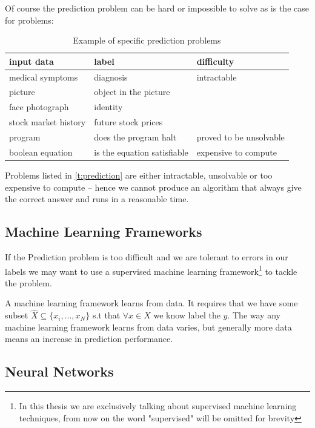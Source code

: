 \documentclass[dissertation.tex]{subfiles}
\begin{document}
Of course the prediction problem can be hard or impossible to solve as is the
case for problems:
\begin{table}[H]
  \centering
    \begin{tabular}{l|l|l}
      input data & label & difficulty \\ 
      \hline
      \rowcolor{Gray}
      medical symptoms & diagnosis & intractable \\ 
      picture  & object in the picture &  \\ 
      \rowcolor{Gray}
      face photograph  & identity &  \\ 
      stock market history  & future stock prices &  \\ 
      \rowcolor{Gray}
      program  & does the program halt & proved to be unsolvable \\ 
      boolean equation  & is the equation satisfiable & expensive to compute 
  \end{tabular}
  \caption{Example of specific prediction problems }
  \label{t:prediction}
\end{table}

Problems listed in \autoref{t:prediction} are either intractable, unsolvable or
too expensive to compute -- hence we cannot produce an algorithm that always
give the correct answer and runs in a reasonable time.

\subsection{Machine Learning Frameworks}

If the Prediction problem is too difficult and we are tolerant to errors in our
labels we may want to use a supervised machine learning framework\footnote{In
this thesis we are exclusively talking about supervised machine learning
techniques, from now on the word "supervised" will be omitted for brevity} to
tackle the problem. 

A machine learning framework learns from data.  It requires that we have some
subset $\hat{X} \subseteq \{x_i,...,x_N\} $ s.t that $ \forall x\in\hat{X}$ we
know label the $y$.  The way any machine learning framework learns from data
varies, but generally more data means an increase in prediction performance.

\subsection{Neural Networks} 
\end{document}
